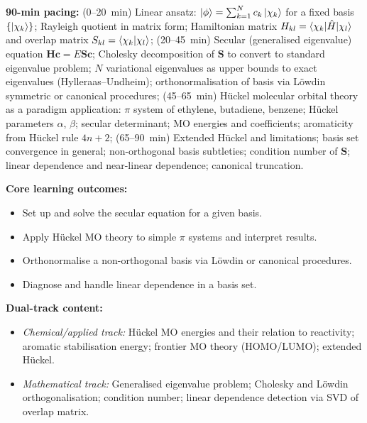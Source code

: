 \documentclass[11pt,a4paper]{article}
\begin{document}
\begin{tcolorbox}[modulebox, title={Module~II.1 --- Lecture L02: The Linear Variational Method}]
\textbf{90-min pacing:} (0--20~min) Linear ansatz:
$\ket{\phi}=\sum_{k=1}^N c_k\ket{\chi_k}$ for a fixed basis $\{\ket{\chi_k}\}$;
Rayleigh quotient in matrix form;
Hamiltonian matrix $H_{kl}=\braket{\chi_k|\hat{H}|\chi_l}$ and
overlap matrix $S_{kl}=\braket{\chi_k|\chi_l}$;
(20--45~min) Secular (generalised eigenvalue) equation $\mathbf{H}\mathbf{c}=E\mathbf{S}\mathbf{c}$;
Cholesky decomposition of $\mathbf{S}$ to convert to standard eigenvalue problem;
$N$ variational eigenvalues as upper bounds to exact eigenvalues (Hylleraas--Undheim);
orthonormalisation of basis via L\"owdin symmetric or canonical procedures;
(45--65~min) H\"uckel molecular orbital theory as a paradigm application:
$\pi$ system of ethylene, butadiene, benzene;
H\"uckel parameters $\alpha$, $\beta$; secular determinant; MO energies and coefficients;
aromaticity from H\"uckel rule $4n+2$;
(65--90~min) Extended H\"uckel and limitations; basis set convergence in general;
non-orthogonal basis subtleties; condition number of $\mathbf{S}$; linear dependence and
near-linear dependence; canonical truncation.

\medskip\textbf{Core learning outcomes:}
\begin{itemize}[leftmargin=1.4em,topsep=2pt,itemsep=1pt]
  \item Set up and solve the secular equation for a given basis.
  \item Apply H\"uckel MO theory to simple $\pi$ systems and interpret results.
  \item Orthonormalise a non-orthogonal basis via L\"owdin or canonical procedures.
  \item Diagnose and handle linear dependence in a basis set.
\end{itemize}

\medskip\textbf{Dual-track content:}
\begin{itemize}[leftmargin=1.4em,topsep=2pt,itemsep=1pt]
  \item \textit{Chemical/applied track:} H\"uckel MO energies and their relation to
    reactivity; aromatic stabilisation energy; frontier MO theory (HOMO/LUMO); extended H\"uckel.
  \item \textit{Mathematical track:} Generalised eigenvalue problem; Cholesky and L\"owdin
    orthogonalisation; condition number; linear dependence detection via SVD of overlap matrix.
\end{itemize}


\end{tcolorbox}
\end{document}
